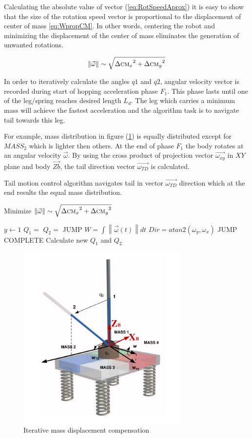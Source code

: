 Calculating the absolute value of vector (\ref{eq:RotSpeedAprox}) it is easy to show that the size of the rotation speed vector is proportional to the displacement of center of mass \eqref{eq:WpropCM}. In other words, centering the robot and minimizing the displacement of the center of mass eliminates the generation of unwanted rotations. 

\begin{equation}\label{eq:WpropCM}
\left \| \vec{\omega} \right \|\sim \sqrt{{\Delta \textsc{cm}_x}^2+{\Delta \textsc{cm}_y}^2}
\end{equation}


In order to iteratively calculate the angles $q1$ and $q2$, angular velocity vector is recorded during start of hopping acceleration phase $F_1$. This phase lasts until one of the leg/spring reaches desired length $L_d$. The leg which carries a minimum mass will achieve the fastest acceleration and the algorithm task is to navigate tail towards this leg. 

For example, mass distribution in figure  (\ref{fig:imassCom}) is equally distributed except for $MASS_2$  which is lighter then others. At the end of phase $F_1$ the body rotates at an angular velocity $\vec{\omega}$. By using the cross product of projection vector $\vec{\omega_{xy}}$ in $XY$ plane and body $\vec{Zb}$, the tail direction vector $\vec{\omega_{TD}}$ is calculated. 

Tail motion control algorithm navigates tail in vector $\vec{\omega_{TD}}$ direction which at the end results the equal mass distribution.

\begin{algorithm}
\caption{Minimize $\left \| \vec{\omega} \right \|\sim \sqrt{{\Delta \textsc{cm}_x}^2+{\Delta \textsc{cm}_y}^2}$}
\begin{algorithmic} 
\STATE $y \leftarrow 1$
\REPEAT
\STATE $Q_1 = $
\STATE $Q_2 = $
\REPEAT
\STATE JUMP
\STATE $W = \int \left \| \vec{\omega}(t) \right \|  dt$
\STATE $Dir = atan2(\omega_y,\omega_x)$
\UNTIL JUMP COMPLETE
\STATE Calculate new $Q_1$ and $Q_2$
\end{algorithmic}
\end{algorithm}


\begin{figure}
	\centering
	\includegraphics[width=85mm]{./pictures/IterativeAlgorithm.pdf}
	\caption{Iterative mass displacement compensation}
	\label{fig:imassCom}
\end{figure}